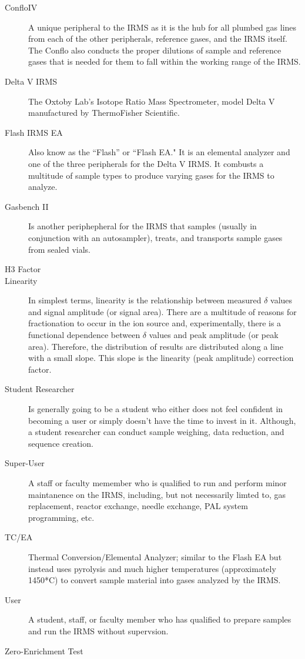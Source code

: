 \documentclass[12pt]{../SOP3}\usepackage[]{graphicx}\usepackage[]{color}
\begin{document}
\begin{description}

\item[ConfloIV] A unique peripheral to the IRMS as it is the hub for all plumbed gas lines from each of the other peripherals, reference gases, and the IRMS itself. The Conflo also conducts the proper dilutions of sample and reference gases that is needed for them to fall within the working range of the IRMS.

\item[Delta V IRMS] \label{IRMS} The Oxtoby Lab's Isotope Ratio Mass Spectrometer, model Delta V manufactured by ThermoFisher Scientific. 

\item[Flash IRMS EA] Also know as the ``Flash'' or ``Flash EA." It is an elemental analyzer and one of the three peripherals for the Delta V IRMS. It combusts a multitude of sample types to produce varying gases for the IRMS to analyze. 

\item[Gasbench II] Is another periphepheral for the IRMS that samples (usually in conjunction with an autosampler), treats, and transports sample gases from sealed vials.

\item[H3 Factor]

\item[Linearity] In simplest terms, linearity is the relationship between measured $\delta$ values and signal amplitude (or signal area). There are a multitude of reasons for fractionation to occur in the ion source and, experimentally, there is a functional dependence between $\delta$ values and peak amplitude (or peak area). Therefore, the distribution of results are distributed along a line with a small slope. This slope is the linearity (peak amplitude) correction factor. 

\item[Student Researcher] Is generally going to be a student who either does not feel confident in becoming a user or simply doesn't have the time to invest in it. Although, a student researcher can conduct sample weighing, data reduction, and sequence creation.

\item[Super-User] \label{Super-User} A staff or faculty memember who is qualified to run and perform minor maintanence on the IRMS, including, but not necessarily limted to, gas replacement, reactor exchange, needle exchange, PAL system programming, etc.  

\item[TC/EA] Thermal Conversion/Elemental Analyzer; similar to the Flash EA but instead uses pyrolysis and much higher temperatures (approximately 1450*C) to convert sample material into gases analyzed by the IRMS.

\item[User] A student, staff, or faculty member who has qualified to prepare samples and run the IRMS without supervsion.

\item[Zero-Enrichment Test]

\end{description}
\end{document}
